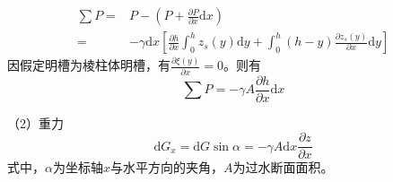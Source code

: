                                                         \begin{equation}
                                                          \begin{aligned}
                                                            \sum P
                                                            =&
                                                            P - \left(P+\frac {\partial P} {\partial x}\mathrm{d}x\right)
                                                            \\
                                                            =&
                                                            -\gamma \mathrm{d}x
                                                            \left[
                                                              \frac{\partial h}{\partial x}
                                                              \int_{0}^{h}\!
                                                              z_{s}(y)
                                                              \mathrm{d}y
                                                              +
                                                              \int_{0}^{h}\!
                                                              (h-y)
                                                              \frac{\partial  z_{s}(y)}{\partial x}
                                                              \mathrm{d}y
                                                            \right]
                                                          \end{aligned}
                                                          \label{EqCGe_SVe_Me_Pressure}
                                                        \end{equation}
                                                        因假定明槽为棱柱体明槽，有$\frac{\partial \xi(y)}{\partial x}=0$。则有
                                                        \begin{equation}
                                                          \sum P
                                                          =
                                                          -\gamma A\frac{\partial h}{\partial x}\mathrm{d}x
                                                        \end{equation}

                                                        （2）重力
                                                        \begin{equation}
                                                          \mathrm{d}G_{x}
                                                          =
                                                          \mathrm{d}G\sin\alpha
                                                          =
                                                          -\gamma A\mathrm{d}x\frac{\partial z}{\partial x}
                                                        \end{equation}
                                                        式中，$\alpha$为坐标轴$x$与水平方向的夹角，$A$为过水断面面积。

